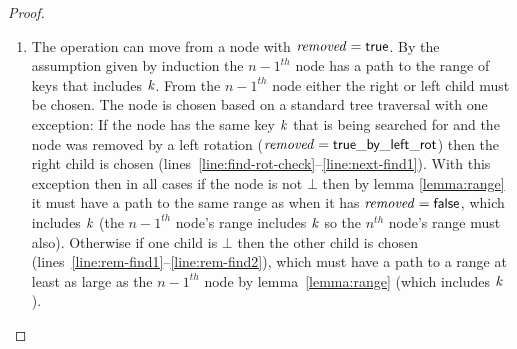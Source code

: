 \begin{proof}
\begin{itemize}
\begin{enumerate}
\item The operation can move from a node with $\ms{removed}=\lit{true}$.
By the assumption given by induction the $n-1^{th}$ node has a path to the range of keys that includes $\ms{k}$.
From the $n-1^{th}$ node either the right or left child must be chosen.
The node is chosen based on a standard tree traversal with one exception:
If the node has the same key $\ms{k}$ that is being searched for and the node was removed by a left rotation
($\ms{removed}=\lit{true\_by\_left\_rot}$) then the right child is chosen (lines~\ref{line:find-rot-check}--\ref{line:next-find1}).
With this exception then in all cases if the node is not $\bot$ then by lemma \ref{lemma:range} it must have a path to the same range as when it has $\ms{removed}=\lit{false}$, which includes $\ms{k}$
(the $n-1^{th}$ node's range includes $\ms{k}$ so the $n^{th}$ node's range must also).
Otherwise if one child is $\bot$ then the other child is chosen (lines~\ref{line:rem-find1}--\ref{line:rem-find2}), which must have a path to a range at
least as large as the $n-1^{th}$ node by lemma~\ref{lemma:range} (which includes $\ms{k}$).
\end{enumerate}
\end{itemize}
\end{proof}

